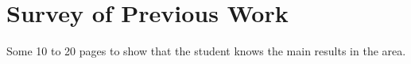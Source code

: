 
\chapter{Survey of Previous Work}
\label{cha:PreviousWork}

Some 10 to 20 pages to show that the student knows the main results in the area.
